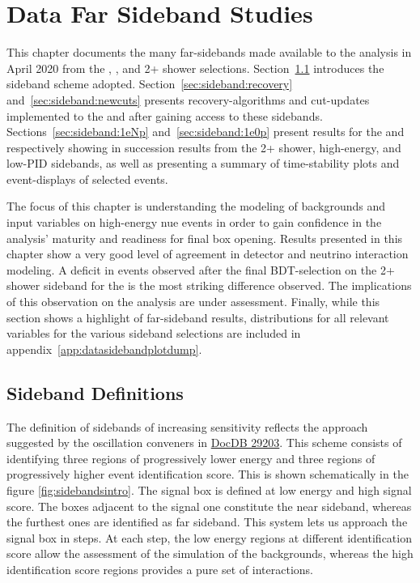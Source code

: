 \section{Data Far Sideband Studies}{}
\label{sec:sidebands}
This chapter documents the many far-sidebands made available to the analysis in April 2020 from the \npsel, \zpsel, and 2+ shower selections. Section~\ref{sec:sideband:definitions} introduces the sideband scheme adopted. Section~\ref{sec:sideband:recovery} and~\ref{sec:sideband:newcuts} presents recovery-algorithms and cut-updates implemented to the \npsel and \zpsel after gaining access to these sidebands. Sections~\ref{sec:sideband:1eNp} and~\ref{sec:sideband:1e0p} present results for the \npsel and \zpsel respectively showing in succession results from the 2+ shower, high-energy, and low-PID sidebands, as well as presenting a summary of time-stability plots and event-displays of selected events. 

The focus of this chapter is understanding the modeling of backgrounds and input variables on high-energy nue events in order to gain confidence in the analysis' maturity and readiness for final box opening. Results presented in this chapter show a very good level of agreement in detector and neutrino interaction modeling. A deficit in events observed after the final BDT-selection on the 2+ shower sideband for the \npsel is the most striking difference observed. The implications of this observation on the analysis are under assessment. Finally, while this section shows a highlight of far-sideband results, distributions for all relevant variables for the various sideband selections are included in appendix~\ref{app:datasidebandplotdump}.

\subsection{Sideband Definitions}
\label{sec:sideband:definitions}
The definition of sidebands of increasing sensitivity reflects the approach suggested by the oscillation conveners in \href{https://microboone-docdb.fnal.gov/cgi-bin/private/ShowDocument?docid=29203}{DocDB 29203}.
This scheme consists of identifying three regions of progressively lower energy and three regions of progressively higher event identification score.
This is shown schematically in the figure \ref{fig:sidebandsintro}.
The signal box is defined at low energy and high signal score.
The boxes adjacent to the signal one constitute the near sideband, whereas the furthest ones are identified as far sideband.
This system lets us approach the signal box in steps.
At each step, the low energy regions at different identification score allow the assessment of the simulation of the backgrounds, whereas the high identification score regions provides a pure set of \nuecc interactions.

